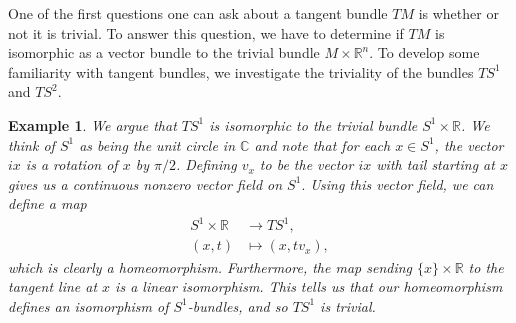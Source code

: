 \documentclass{amsart}          %
\newtheorem{example}[theorem]{Example}
\newcommand{\R}{\mathbb R}
\newcommand{\C}{\mathbb C}
\begin{document}
One of the first questions one can ask about a tangent bundle $TM$ is whether or not it is trivial. To answer this question, we have to determine if $TM$ is isomorphic as a vector bundle to the trivial bundle $M\times \R^n$. To develop some familiarity with tangent bundles, we investigate the triviality of the bundles $TS^1$ and $TS^2$.
\begin{example} We argue that $TS^1$ is isomorphic to the trivial bundle $S^1\times\R$.
	We think of $S^1$ as being the unit circle in $\C$ and note that for each $x\in S^1$, the vector $ix$ is a rotation of $x$ by $\pi/2$. Defining $v_x$ to be the vector $ix$ with tail starting at $x$ gives us a continuous nonzero vector field on $S^1.$ Using this vector field, we can define a map
	\begin{align*}
	S^1\times\R&\to TS^1,\\
	(x,t)&\mapsto (x,tv_x),
 	\end{align*}
 	which is clearly a homeomorphism. Furthermore, the map sending $\{x\}\times\R$ to the tangent line at $x$ is a linear isomorphism. This tells us that our homeomorphism defines an isomorphism of $S^1$-bundles, and so $TS^1$ is trivial.
\end{example}
\end{document}
